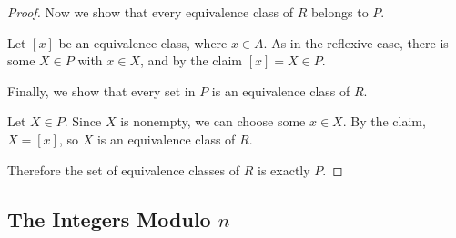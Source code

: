 \documentclass[DIN, pagenumber=false, fontsize=11pt, parskip=half]{scrartcl}
\begin{document}
\begin{problems}
\begin{proof}
        Now we show that every equivalence class of $R$ belongs to $P$. 

        Let $[x]$ be an equivalence class, where $x \in A$. 
        As in the reflexive case, there is some $X \in P$ with $x \in X$, and by the claim $[x] = X \in P$.

        Finally, we show that every set in $P$ is an equivalence class of $R$. 

        Let $X \in P$. Since $X$ is nonempty, we can choose some $x \in X$. 
        By the claim, $X = [x]$, so $X$ is an equivalence class of $R$.

        Therefore the set of equivalence classes of $R$ is exactly $P$.
    \end{proof}
\end{problems}

\subsection{The Integers Modulo $n$}
\end{document}
